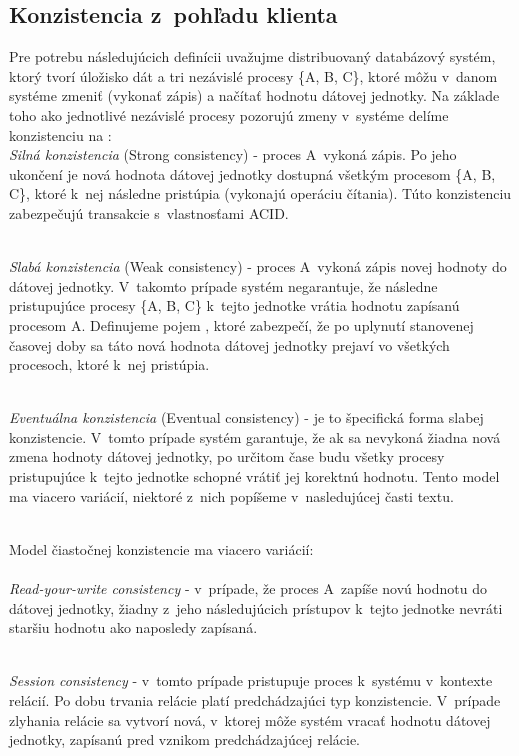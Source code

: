 \documentclass[11pt,twoside,a4paper]{book}
\begin{document}
\subsection{Konzistencia z~pohľadu klienta}

Pre potrebu následujúcich definícii uvažujme distribuovaný databázový systém, ktorý tvorí úložisko dát a tri nezávislé procesy \{A, B, C\}, ktoré môžu v~danom systéme zmeniť (vykonať zápis) a načítať hodnotu dátovej jednotky. Na základe toho ako jednotlivé nezávislé procesy pozorujú zmeny v~systéme delíme konzistenciu  na \cite{vogels2009eventually}: \\

\noindent 
\emph{Silná konzistencia} (Strong consistency) - proces A~vykoná zápis. Po jeho ukončení je nová hodnota dátovej jednotky dostupná všetkým procesom \{A, B, C\}, ktoré k~nej následne pristúpia (vykonajú operáciu čítania). Túto konzistenciu zabezpečujú transakcie s~vlastnosťami ACID.

\noindent 
\\
\emph{Slabá konzistencia} (Weak consistency) - proces A~vykoná zápis novej hodnoty do dátovej jednotky. V~takomto prípade systém negarantuje, že následne pristupujúce procesy \{A, B, C\} k~tejto jednotke vrátia hodnotu zapísanú procesom A. Definujeme pojem , ktoré zabezpečí, že po uplynutí stanovenej časovej doby sa táto nová hodnota dátovej jednotky prejaví vo všetkých procesoch, ktoré k~nej pristúpia.

\noindent 
\\
\emph{Eventuálna konzistencia} (Eventual consistency) - je to špecifická forma slabej konzistencie. V~tomto prípade systém garantuje, že ak sa nevykoná žiadna nová zmena hodnoty dátovej jednotky, po určitom čase budu všetky procesy pristupujúce k~tejto jednotke schopné vrátiť jej korektnú hodnotu. Tento model ma viacero variácií, niektoré z~nich popíšeme v~nasledujúcej časti textu.

\noindent 
\\
Model čiastočnej konzistencie ma viacero variácií:\\
\noindent 
\\
\emph{Read-your-write consistency} - v~prípade, že proces A~zapíše novú hodnotu do dátovej jednotky, žiadny z~jeho následujúcich prístupov k~tejto jednotke nevráti staršiu hodnotu ako naposledy zapísaná.

\noindent
\\
\emph{Session consistency} - v~tomto prípade pristupuje proces k~systému v~kontexte relácií. Po dobu trvania relácie platí predchádzajúci typ konzistencie. V~prípade zlyhania relácie sa vytvorí nová, v~ktorej môže systém vracať hodnotu dátovej jednotky, zapísanú pred vznikom predchádzajúcej relácie.
\end{document}
